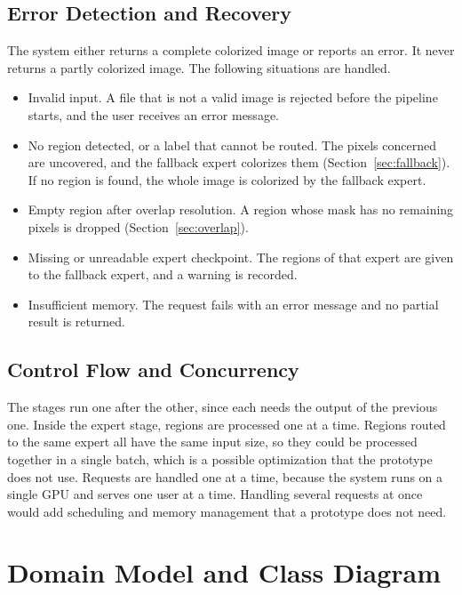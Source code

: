 \documentclass{FastFyp}
\begin{document}
\subsection{Error Detection and Recovery}

The system either returns a complete colorized image or reports an error. It never returns a partly colorized image. The following situations are handled.

\begin{itemize}
    \item Invalid input. A file that is not a valid image is rejected before the pipeline starts, and the user receives an error message.
    \item No region detected, or a label that cannot be routed. The pixels concerned are uncovered, and the fallback expert colorizes them (Section~\ref{sec:fallback}). If no region is found, the whole image is colorized by the fallback expert.
    \item Empty region after overlap resolution. A region whose mask has no remaining pixels is dropped (Section~\ref{sec:overlap}).
    \item Missing or unreadable expert checkpoint. The regions of that expert are given to the fallback expert, and a warning is recorded.
    \item Insufficient memory. The request fails with an error message and no partial result is returned.
\end{itemize}

\subsection{Control Flow and Concurrency}

The stages run one after the other, since each needs the output of the previous one. Inside the expert stage, regions are processed one at a time. Regions routed to the same expert all have the same input size, so they could be processed together in a single batch, which is a possible optimization that the prototype does not use. Requests are handled one at a time, because the system runs on a single GPU and serves one user at a time. Handling several requests at once would add scheduling and memory management that a prototype does not need.

\section{Domain Model and Class Diagram}
\label{sec:classdiagram}
\end{document}

